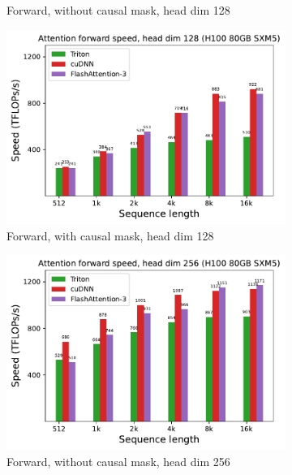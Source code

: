 \begin{figure}[ht]
\begin{subfigure}{.5\textwidth}
    \caption{Forward, without causal mask, head dim 128}
  \end{subfigure}%
  \begin{subfigure}{.5\textwidth}
    \centering
    \includegraphics[width=.95\linewidth]{figs/flash3_h100_fp8_causal_True_hdim_128_fwd_speed.pdf}
    \caption{Forward, with causal mask, head dim 128}
  \end{subfigure}
  \begin{subfigure}{.5\textwidth}
    \centering
    \includegraphics[width=.95\linewidth]{figs/flash3_h100_fp8_causal_False_hdim_256_fwd_speed.pdf}
    \caption{Forward, without causal mask, head dim 256}
  \end{subfigure}%
  \begin{subfigure}{.5\textwidth}
    \centering

\end{subfigure}
\end{figure}
